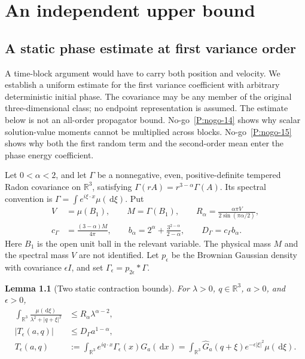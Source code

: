 \documentclass[12pt,oneside,openany]{book}
\makeatletter
\let\lean@pending\@empty
\newcommand{\LeanMarker}[1]{\gdef\lean@pending{#1}}
\numberwithin{equation}{section}
\newtheorem{lemma}[theorem]{Lemma}
\theoremstyle{nogostyle}
\theoremstyle{definition}
\newcommand{\R}{\mathbb{R}}
\newcommand{\ud}{\,\mathrm{d}}
\makeatother
\begin{document}
\chapter{An independent upper bound}\label{S:book-independent-upper}



\section{A static phase estimate at first variance order}
\label{S:static-phase}

A time-block argument would have to carry both position and velocity. We
establish a uniform estimate for the first variance coefficient with arbitrary
deterministic initial phase. The covariance may be any member of the original
three-dimensional class; no endpoint representation is assumed. The estimate
below is not an all-order propagator bound.
No-go~\ref{P:nogo-14} shows why scalar solution-value moments cannot be
multiplied across blocks. No-go~\ref{P:nogo-15} shows why both the first
random term and the second-order mean enter the phase energy coefficient.



Let $0 < \alpha < 2$, and let $\Gamma$ be a nonnegative, even, positive-definite
tempered Radon covariance on $\R^3$, satisfying $\Gamma(rA) =
r^{3-\alpha}\Gamma(A)$. Its spectral convention is $\Gamma = \int e^{i\xi\cdot
x}\mu(\ud\xi)$. Put
\begin{equation}\label{E:phase-constants}
  \begin{split}
    V&=\mu(B_1),\qquad M=\Gamma(B_1),\qquad
    R_\alpha=\frac{\alpha\pi V}{2\sin(\pi\alpha/2)},\\
    c_\Gamma&=\frac{(3-\alpha)M}{4\pi},\qquad
    b_\alpha=2^\alpha+\frac{3^{2-\alpha}}{2-\alpha},\qquad
    D_\Gamma=c_\Gamma b_\alpha.
  \end{split}
\end{equation}
Here $B_1$ is the open unit ball in the relevant variable. The physical mass $M$
and the spectral mass $V$ are not identified. Let $p_\epsilon$ be the Brownian
Gaussian density with covariance $\epsilon I$, and set $\Gamma_\epsilon =
p_{2\epsilon}*\Gamma$.

\LeanMarker{L:phase-contractions}
\begin{lemma}[Two static contraction bounds]\label{L:phase-contractions}
  For $\lambda > 0$, $q \in \R^3$, $a > 0$, and $\epsilon > 0$,
  \begin{align}
    \int_{\R^3}\frac{\mu(\ud\xi)}{\lambda^2+|q+\xi|^2}
    &\le R_\alpha\lambda^{\alpha-2},
    \label{E:phase-resolvent}\\
    \left|T_\epsilon(a,q)\right|
    &\le D_\Gamma a^{1-\alpha},
    \label{E:phase-trace}\\
    T_\epsilon(a,q)
    &:=\int_{\R^3}e^{iq\cdot x}\Gamma_\epsilon(x)G_a(\ud x)
    =\int_{\R^3}\widehat{G}_a(q+\xi)e^{-\epsilon|\xi|^2}
    \mu(\ud\xi).\nonumber
  \end{align}
\end{lemma}
\end{document}
